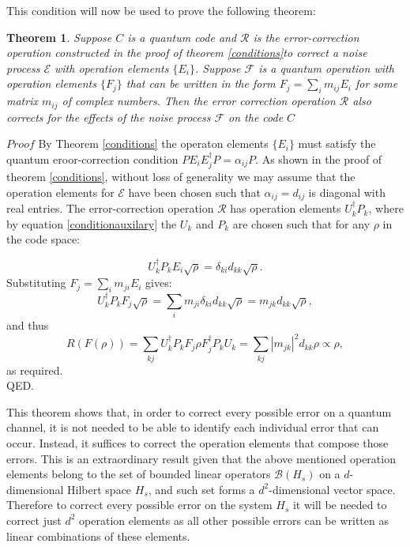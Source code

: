 \documentclass{article}
\newtheorem{theorem}{Theorem}
\begin{document}
\vspace{10pt}

\noindent This condition will now be used to prove the following theorem:

\begin{theorem}
	Suppose $C$ is a quantum code and $\mathcal{R}$ is the error-correction operation
	constructed in the proof of theorem \ref{conditions}to correct a
	noise process $\mathcal{E}$ with operation elements $\{E_i\}$.
	Suppose $\mathcal{F}$ is a quantum operation with operation elements $\{F_j\}$
	that can be written in the form $F_j = \sum_i m_{ij} E_i$ for some matrix $m_{ij}$
	of complex numbers.
	Then the error correction operation $\mathcal{R}$ also corrects for the effects
	of the noise process $\mathcal{F}$ on the code $C$
\end{theorem}


\noindent $Proof$
By Theorem \ref{conditions} the operaton elements
$\{E_i\}$ must satisfy the quantum eroor-correction condition $PE_iE_j^\dag P = \alpha_{ij}P$.
As shown in the proof of theorem \ref{conditions},
without loss of generality we may assume that the operation elements for $\mathcal{E}$
have been chosen such that $\alpha_{ij} = d_{ij}$ is diagonal with real entries.
The error-correction operation $\mathcal{R}$ has operation elements $U_k^\dagger P_k$, where by equation
\ref{conditionauxilary} the $U_k$ and $P_k$ are chosen such that for any $\rho$ in
the code space:

\begin{equation}
	U_k^\dagger P_k E_i \sqrt{\rho} = \delta_{ki} d_{kk} \sqrt{\rho}.
\end{equation}
Substituting $F_j = \sum_i m_{ji} E_i$ gives:
\begin{equation}
	U_k^\dagger P_k F_j \sqrt{\rho} = \sum_i m_{ji} \delta_{ki} d_{kk} \sqrt{\rho} = m_{jk} d_{kk} \sqrt{\rho},
\end{equation}
and thus
\begin{equation}
	R(F(\rho)) = \sum_{kj} U_k^\dagger P_k F_j \rho F_j^\dagger P_k U_k = \sum_{kj} |m_{jk}|^2 d_{kk} \rho \propto \rho,
\end{equation}
as required. \\
QED.

\vspace{10pt}

\noindent This theorem shows that, in order to correct every possible error on a quantum channel,
it is not needed to be able to identify each individual error that can occur.
Instead, it suffices to correct the operation elements that compose those errors.
This is an extraordinary result given that the above mentioned operation elements belong
to the set of bounded linear operators $\mathcal{B}(H_s)$ on a $d$-dimensional Hilbert space
$H_s$, and such set forms a $d^2$-dimensional vector space.
Therefore to correct every possible error on the system $H_s$ it will be needed to
correct just $d^2$ operation elements as all other possible errors can be written
as linear combinations of these elements.
\end{document}
